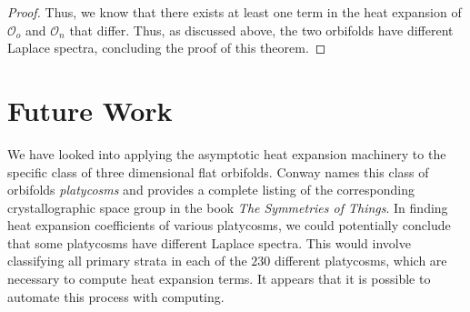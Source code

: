 \documentclass{article}[12pt]
\theoremstyle{definition}
\newcommand{\orb}{\mathcal{O}}
\begin{document}
\begin{proof}
Thus, we know that there exists at least one term in the heat expansion of
$\orb_o$ and $\orb_n$ that differ. Thus, as discussed above, the two
orbifolds have different Laplace spectra, concluding the proof of this
theorem.
\end{proof}

\section{Future Work}

We have looked into applying the asymptotic heat expansion machinery to the
specific class of three dimensional flat orbifolds. Conway names this class
of orbifolds \emph{platycosms}\cite{platy} and provides a complete listing of
the corresponding crystallographic space group in the book \textit{The
Symmetries of Things}\cite{SOT}. In finding heat expansion coefficients of
various platycosms, we could potentially conclude that some platycosms have
different Laplace spectra. This would involve classifying all primary
strata in each of the $230$ different platycosms, which are necessary to
compute heat expansion terms. It appears that it is possible to automate
this process with computing.


\nocite{*}

\end{document}
